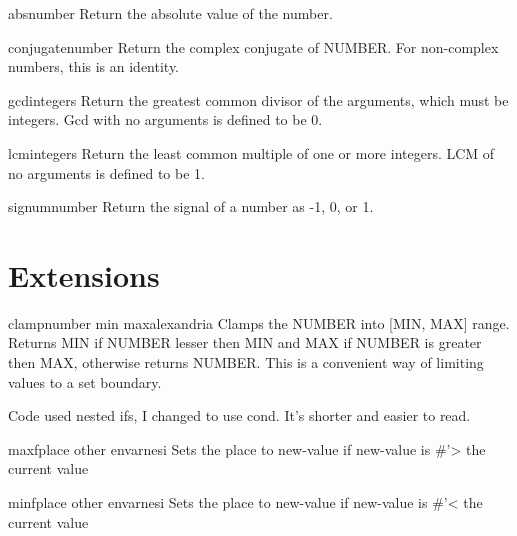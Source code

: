 \begin{function}{abs}{number}{}{}
  Return the absolute value of the number.
\end{function}

\begin{function}{conjugate}{number}{}{}
  Return the complex conjugate of NUMBER. For non-complex numbers, this is
  an identity.
\end{function}

\begin{function}{gcd}{\rest integers}{}{}
  Return the greatest common divisor of the arguments, which must be
  integers. Gcd with no arguments is defined to be 0.
\end{function}

\begin{function}{lcm}{\rest integers}{}{}
  Return the least common multiple of one or more integers. LCM of no
  arguments is defined to be 1.
\end{function}

\begin{function}{signum}{number}{}{}
  Return the signal of a number as -1, 0, or 1.
\end{function}

\section{Extensions}
\label{sec:extensions-1}

\begin{function}{clamp}{number min max}{alexandria}{}
  Clamps the NUMBER into [MIN, MAX] range. Returns MIN if NUMBER
  lesser then MIN and MAX if NUMBER is greater then MAX, otherwise
  returns NUMBER. This is a convenient way of limiting values to a set
  boundary.
  \begin{devnote}
    Code used nested ifs, I changed to use cond. It's shorter and
    easier to read.
  \end{devnote}
\end{function}

\begin{macro}{maxf}{place other \env env}{arnesi}{}
  Sets the place to new-value if new-value is \#'> the current value
\end{macro}

\begin{macro}{minf}{place other \env env}{arnesi}{}
  Sets the place to new-value if new-value is \#'< the current value
\end{macro}

